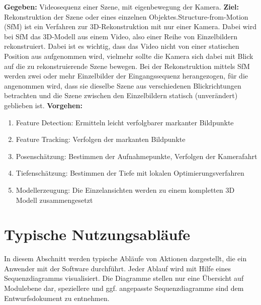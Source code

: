 \textbf{Gegeben:}\newline
Videosequenz einer Szene, mit eigenbewegung der Kamera.\newline
\textbf{Ziel:}\newline
Rekonstruktion der Szene oder eines einzelnen Objektes.\newline Structure-from-Motion (SfM) ist ein Verfahren zur 3D-Rekonstruktion mit nur einer Kamera. Dabei wird bei SfM das 3D-Modell aus einem Video, also einer Reihe von Einzelbildern rekonstruiert. Dabei ist es wichtig, dass das Video nicht von einer statischen Position aus aufgenommen wird, vielmehr sollte die Kamera sich dabei mit Blick auf die zu rekonstruierende Szene bewegen. Bei der Rekonstruktion mittels SfM werden zwei oder mehr Einzelbilder der Eingangssequenz herangezogen, für die angenommen wird, dass sie dieselbe Szene aus verschiedenen Blickrichtungen betrachten und die Szene zwischen den Einzelbildern statisch (unverändert) geblieben ist.\newline
\textbf{Vorgehen:}
\begin{enumerate}
\item Feature Detection: Ermitteln leicht verfolgbarer markanter Bildpunkte\item Feature Tracking: Verfolgen der markanten Bildpunkte\item Posenschätzung: Bestimmen der Aufnahmepunkte, Verfolgen der Kamerafahrt\item Tiefenschätzung: Bestimmen der Tiefe mit lokalen Optimierungsverfahren\item Modellerzeugung: Die Einzelansichten werden zu einem kompletten 3D Modell zusammengesetzt
\end{enumerate}

\section{Typische Nutzungsabläufe}
In diesem Abschnitt werden typische Abläufe von Aktionen dargestellt, die ein Anwender mit der Software durchführt. Jeder Ablauf wird mit Hilfe eines Sequenzdiagramms visualisiert. Die Diagramme stellen nur eine Übersicht auf Modulebene dar, speziellere und ggf. angepasste Sequenzdiagramme sind dem Entwurfsdokument zu entnehmen.

